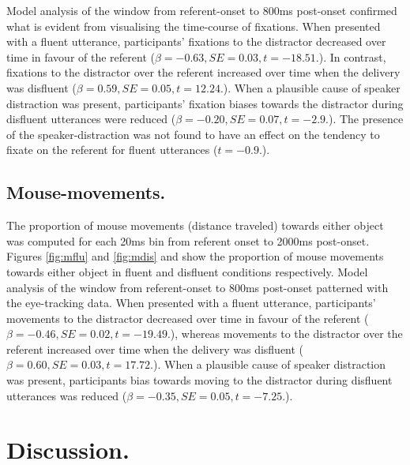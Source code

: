 \documentclass[man]{apa6}
\begin{document}
Model analysis of the window from referent-onset to 800ms post-onset confirmed what is evident from visualising the time-course of fixations. 
When presented with a fluent utterance, participants' fixations to the distractor decreased over time in favour of the referent ($\beta = -0.63, SE = 0.03, t=-18.51.$). 
In contrast, fixations to the distractor over the referent increased over time when the delivery was disfluent ($\beta = 0.59, SE = 0.05, t=12.24.$). 
When a plausible cause of speaker distraction was present, participants' fixation biases towards the distractor during disfluent utterances were reduced ($\beta = -0.20, SE = 0.07, t=-2.9.$). 
The presence of the speaker-distraction was not found to have an effect on the tendency to fixate on the referent for fluent utterances ($t=-0.9.$).\\

\subsection{Mouse-movements.}
The proportion of mouse movements (distance traveled) towards either object was computed for each 20ms bin from referent onset to 2000ms post-onset. 
Figures \ref{fig:mflu} and \ref{fig:mdis} and show the proportion of mouse movements towards either object in fluent and disfluent conditions respectively. 
Model analysis of the window from referent-onset to 800ms post-onset patterned with the eye-tracking data. 
When presented with a fluent utterance, participants' movements to the distractor decreased over time in favour of the referent ($\beta = -0.46, SE = 0.02, t=-19.49.$), whereas movements to the distractor over the referent increased over time when the delivery was disfluent ($\beta = 0.60, SE = 0.03, t=17.72.$). 
When a plausible cause of speaker distraction was present, participants bias towards moving to the distractor during disfluent utterances was reduced ($\beta = -0.35, SE = 0.05, t=-7.25.$).\\


\section{Discussion.}
\end{document}
